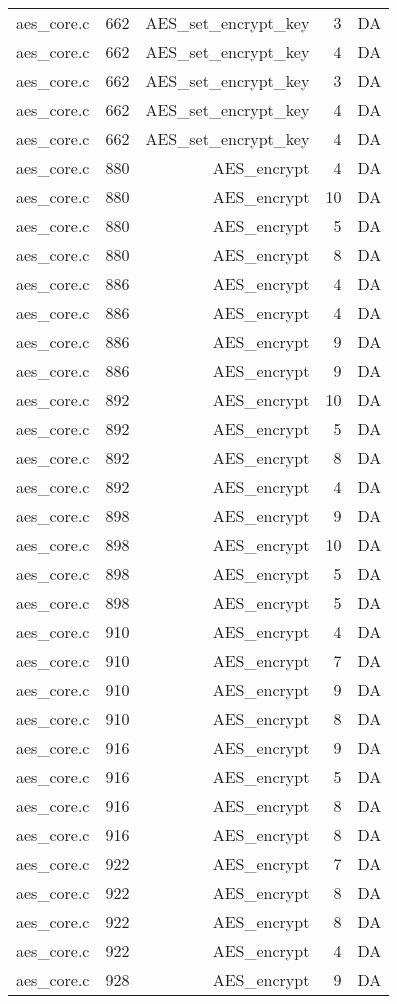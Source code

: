 \begin{table}[h]
{\begin{tabular}{clrrr}
aes\_core.c&662&AES\_set\_encrypt\_key&3 &DA\\
aes\_core.c&662&AES\_set\_encrypt\_key&4 &DA\\
aes\_core.c&662&AES\_set\_encrypt\_key&3 &DA\\
aes\_core.c&662&AES\_set\_encrypt\_key&4 &DA\\
aes\_core.c&662&AES\_set\_encrypt\_key&4 &DA\\
aes\_core.c&880&AES\_encrypt&4 &DA\\
aes\_core.c&880&AES\_encrypt&10&DA\\
aes\_core.c&880&AES\_encrypt&5 &DA\\
aes\_core.c&880&AES\_encrypt&8 &DA\\
aes\_core.c&886&AES\_encrypt&4 &DA\\
aes\_core.c&886&AES\_encrypt&4 &DA\\
aes\_core.c&886&AES\_encrypt&9 &DA\\
aes\_core.c&886&AES\_encrypt&9 &DA\\
aes\_core.c&892&AES\_encrypt&10&DA\\
aes\_core.c&892&AES\_encrypt&5 &DA\\
aes\_core.c&892&AES\_encrypt&8 &DA\\
aes\_core.c&892&AES\_encrypt&4 &DA\\
aes\_core.c&898&AES\_encrypt&9 &DA\\
aes\_core.c&898&AES\_encrypt&10&DA\\
aes\_core.c&898&AES\_encrypt&5 &DA\\
aes\_core.c&898&AES\_encrypt&5 &DA\\
aes\_core.c&910&AES\_encrypt&4 &DA\\
aes\_core.c&910&AES\_encrypt&7 &DA\\
aes\_core.c&910&AES\_encrypt&9 &DA\\
aes\_core.c&910&AES\_encrypt&8 &DA\\
aes\_core.c&916&AES\_encrypt&9 &DA\\
aes\_core.c&916&AES\_encrypt&5 &DA\\
aes\_core.c&916&AES\_encrypt&8 &DA\\
aes\_core.c&916&AES\_encrypt&8 &DA\\
aes\_core.c&922&AES\_encrypt&7 &DA\\
aes\_core.c&922&AES\_encrypt&8 &DA\\
aes\_core.c&922&AES\_encrypt&8 &DA\\
aes\_core.c&922&AES\_encrypt&4 &DA\\
aes\_core.c&928&AES\_encrypt&9 &DA\\

\end{tabular}}
\end{table}
